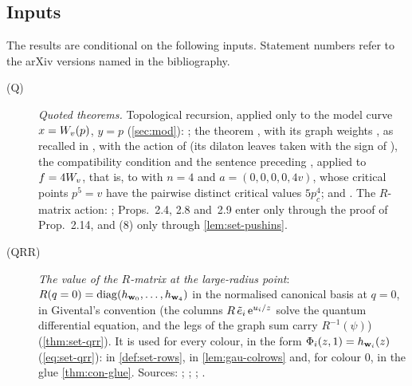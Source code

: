 
\subsection{Inputs}
\label{sec:int-inputs}

The results are conditional on the following inputs. Statement numbers refer to the arXiv versions named in the bibliography.
\begin{description}
\item[(Q)] \emph{Quoted theorems.} Topological recursion, applied only to the model curve $x=W_{v}(p)$, $y=p$ (\cref{sec:mod}): \cite[Def.~4.2, (4-9), with the kernel (4-3); Theorems~4.2 and~4.6; Theorem~5.1, (5-14), with \S5.3, (5-27)--(5-30)]{Eynard:2007kz}; the theorem \cite[Theorem~4.1]{DuninBarkowski:2012bw}, with its graph weights \cite[\S2.3]{DuninBarkowski:2012bw}, as recalled in \cite[\S2.6, (2-30)--(2-35)]{Dunin-Barkowski:2015caa}, with the action of \cite[\S2.3]{Dunin-Barkowski:2015caa} (its dilaton leaves taken with the sign of \cite[Def.~2.13]{PPZ15}), the compatibility condition \cite[Prop.~4.3 (1)]{Dunin-Barkowski:2015caa} and the sentence preceding \cite[Theorem~8.1]{Dunin-Barkowski:2015caa}, applied to $f=4W_{v}$, that is, to \cite[(8-1)]{Dunin-Barkowski:2015caa} with $n=4$ and $a=(0,0,0,0,4v)$, whose critical points $p^5=v$ have the pairwise distinct critical values $5p_c^4$; and \cite[Theorem~7.1: (7.6), (7.7) with its factor $1/\hbar^2$, (7.9), (7.10), with the kernel (1.1)]{ABDKS25}. The $R$-matrix action: \cite[\S0.2, (1); Def.~0.3 (iii); (5); Remark~2.1 and (6); Def.~2.2, with the convention stated after it; Prop.~2.4; Def.~2.5, with the convention stated after it; Props.~2.8 and~2.9; Prop.~2.12, with the formula (8) in its proof; Def.~2.13; Prop.~2.14]{PPZ15}; Props.~2.4, 2.8 and~2.9 enter only through the proof of Prop.~2.14, and (8) only through \cref{lem:set-pushins}.
\item[(QRR)] \emph{The value of the $R$-matrix at the large-radius point}: $R(q=0)=\operatorname{diag}(h_{\mathbf{w}_0},\dots,h_{\mathbf{w}_4})$ in the normalised canonical basis at $q=0$, in Givental's convention (the columns $R\,\tilde e_i\,\mathrm{e}^{u_i/z}$ solve the quantum differential equation, and the legs of the graph sum carry $R^{-1}(\psi)$) (\cref{thm:set-qrr}). It is used for every colour, in the form $\Phi_i(z,1)=h_{\mathbf{w}_i}(z)$ (\cref{eq:set-qrr}): in \cref{def:set-rows}, in \cref{lem:gau-colrows} and, for colour $0$, in the glue \cref{thm:con-glue}. Sources: \cite[(17), in the proof of Lemma~5.2]{GJR18}; \cite[(19)--(20), in the proof of Lemma~4.6, at $t=0$]{GJR17}; \cite[\S2.2, Theorem~1 and the Remark after it]{Giv01}; \cite[Theorem~1, Corollary~1]{MR2276766}.

\end{description}
